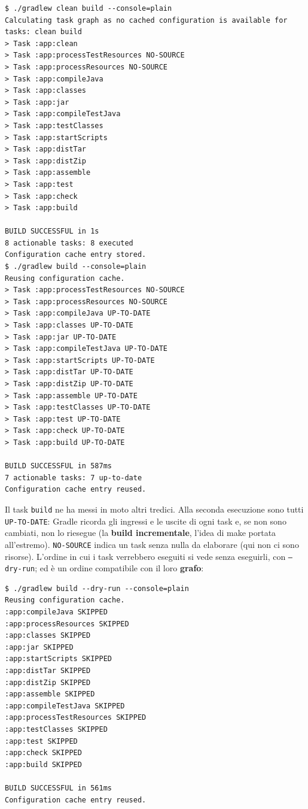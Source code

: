 \begin{lstlisting}[style=shell, name=Terminale]
$ ./gradlew clean build --console=plain
Calculating task graph as no cached configuration is available for tasks: clean build
> Task :app:clean
> Task :app:processTestResources NO-SOURCE
> Task :app:processResources NO-SOURCE
> Task :app:compileJava
> Task :app:classes
> Task :app:jar
> Task :app:compileTestJava
> Task :app:testClasses
> Task :app:startScripts
> Task :app:distTar
> Task :app:distZip
> Task :app:assemble
> Task :app:test
> Task :app:check
> Task :app:build

BUILD SUCCESSFUL in 1s
8 actionable tasks: 8 executed
Configuration cache entry stored.
$ ./gradlew build --console=plain
Reusing configuration cache.
> Task :app:processTestResources NO-SOURCE
> Task :app:processResources NO-SOURCE
> Task :app:compileJava UP-TO-DATE
> Task :app:classes UP-TO-DATE
> Task :app:jar UP-TO-DATE
> Task :app:compileTestJava UP-TO-DATE
> Task :app:startScripts UP-TO-DATE
> Task :app:distTar UP-TO-DATE
> Task :app:distZip UP-TO-DATE
> Task :app:assemble UP-TO-DATE
> Task :app:testClasses UP-TO-DATE
> Task :app:test UP-TO-DATE
> Task :app:check UP-TO-DATE
> Task :app:build UP-TO-DATE

BUILD SUCCESSFUL in 587ms
7 actionable tasks: 7 up-to-date
Configuration cache entry reused.
\end{lstlisting}

Il task \texttt{build} ne ha messi in moto altri tredici. Alla seconda esecuzione sono tutti \texttt{UP-TO-DATE}: Gradle
ricorda gli ingressi e le uscite di ogni task e, se non sono cambiati, non lo riesegue (la \textbf{build incrementale},
l'idea di make portata all'estremo). \texttt{NO-SOURCE} indica un task senza nulla da elaborare (qui non ci sono
risorse). L'ordine in cui i task verrebbero eseguiti si vede senza eseguirli, con \texttt{--dry-run}; ed è un ordine
compatibile con il loro \textbf{grafo}:

\begin{lstlisting}[style=shell, name=Terminale]
$ ./gradlew build --dry-run --console=plain
Reusing configuration cache.
:app:compileJava SKIPPED
:app:processResources SKIPPED
:app:classes SKIPPED
:app:jar SKIPPED
:app:startScripts SKIPPED
:app:distTar SKIPPED
:app:distZip SKIPPED
:app:assemble SKIPPED
:app:compileTestJava SKIPPED
:app:processTestResources SKIPPED
:app:testClasses SKIPPED
:app:test SKIPPED
:app:check SKIPPED
:app:build SKIPPED

BUILD SUCCESSFUL in 561ms
Configuration cache entry reused.
\end{lstlisting}

